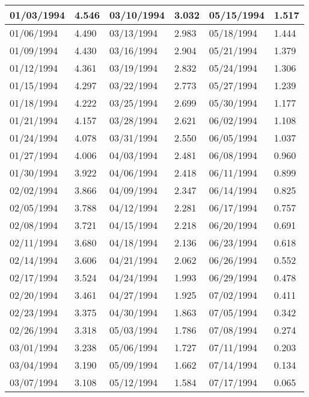 \begin{tabular}{|l|l|l|l|l|l|}
\hline
01/03/1994 & 4.546  & 03/10/1994 & 3.032  & 05/15/1994 & 1.517  \\
\hline
01/06/1994 & 4.490  & 03/13/1994 & 2.983  & 05/18/1994 & 1.444  \\
\hline
01/09/1994 & 4.430  & 03/16/1994 & 2.904  & 05/21/1994 & 1.379  \\
\hline
01/12/1994 & 4.361  & 03/19/1994 & 2.832  & 05/24/1994 & 1.306  \\
\hline
01/15/1994 & 4.297  & 03/22/1994 & 2.773  & 05/27/1994 & 1.239  \\
\hline
01/18/1994 & 4.222  & 03/25/1994 & 2.699  & 05/30/1994 & 1.177  \\
\hline
01/21/1994 & 4.157  & 03/28/1994 & 2.621  & 06/02/1994 & 1.108  \\
\hline
01/24/1994 & 4.078  & 03/31/1994 & 2.550  & 06/05/1994 & 1.037  \\
\hline
01/27/1994 & 4.006  & 04/03/1994 & 2.481  & 06/08/1994 & 0.960  \\
\hline
01/30/1994 & 3.922  & 04/06/1994 & 2.418  & 06/11/1994 & 0.899  \\
\hline
02/02/1994 & 3.866  & 04/09/1994 & 2.347  & 06/14/1994 & 0.825  \\
\hline
02/05/1994 & 3.788  & 04/12/1994 & 2.281  & 06/17/1994 & 0.757  \\
\hline
02/08/1994 & 3.721  & 04/15/1994 & 2.218  & 06/20/1994 & 0.691  \\
\hline
02/11/1994 & 3.680  & 04/18/1994 & 2.136  & 06/23/1994 & 0.618  \\
\hline
02/14/1994 & 3.606  & 04/21/1994 & 2.062  & 06/26/1994 & 0.552  \\
\hline
02/17/1994 & 3.524  & 04/24/1994 & 1.993  & 06/29/1994 & 0.478  \\
\hline
02/20/1994 & 3.461  & 04/27/1994 & 1.925  & 07/02/1994 & 0.411  \\
\hline
02/23/1994 & 3.375  & 04/30/1994 & 1.863  & 07/05/1994 & 0.342  \\
\hline
02/26/1994 & 3.318  & 05/03/1994 & 1.786  & 07/08/1994 & 0.274  \\
\hline
03/01/1994 & 3.238  & 05/06/1994 & 1.727  & 07/11/1994 & 0.203  \\
\hline
03/04/1994 & 3.190  & 05/09/1994 & 1.662  & 07/14/1994 & 0.134  \\
\hline
03/07/1994 & 3.108  & 05/12/1994 & 1.584  & 07/17/1994 & 0.065  \\
\hline
\end{tabular}
